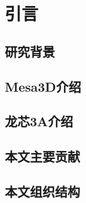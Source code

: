 

\chapter{引言}
\label{cha:intro}
  
\section{研究背景}


\section{Mesa3D介绍}


\section{龙芯3A介绍}


\section{本文主要贡献}


\section{本文组织结构}

